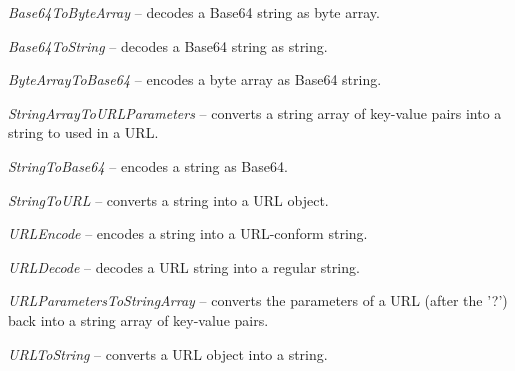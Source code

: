 \documentclass[a4paper]{book}
\begin{document}
\begin{tight_itemize}
    \item \textit{Base64ToByteArray} -- decodes a Base64 string as byte array.
    \item \textit{Base64ToString} -- decodes a Base64 string as string.
    \item \textit{ByteArrayToBase64} -- encodes a byte array as Base64 string.
    \item \textit{StringArrayToURLParameters} -- converts a string array of
    key-value pairs into a string to used in a URL.
    \item \textit{StringToBase64} -- encodes a string as Base64.
    \item \textit{StringToURL} -- converts a string into a URL object.
    \item \textit{URLEncode} -- encodes a string into a URL-conform string.
    \item \textit{URLDecode} -- decodes a URL string into a regular string.
    \item \textit{URLParametersToStringArray} -- converts the parameters of
    a URL (after the '?') back into a string array of key-value pairs.
    \item \textit{URLToString} -- converts a URL object into a string.
\end{tight_itemize}



\end{document}
